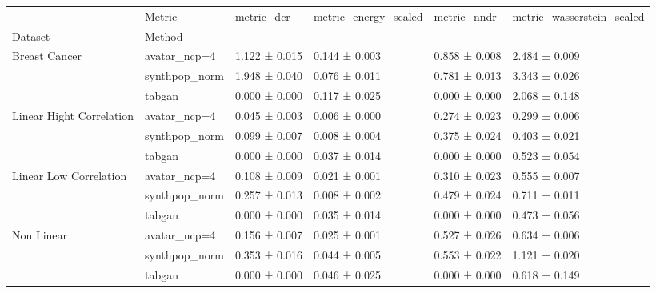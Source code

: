 \begin{tabular}{llllll}
\toprule
 & Metric & metric_dcr & metric_energy_scaled & metric_nndr & metric_wasserstein_scaled \\
Dataset & Method &  &  &  &  \\
\midrule
\multirow[t]{3}{*}{Breast Cancer} & avatar_ncp=4 & 1.122 ± 0.015 & \cellcolor{myred}0.144 ± 0.003 & \cellcolor{myred}0.858 ± 0.008 & 2.484 ± 0.009 \\
 & synthpop_norm & \cellcolor{myred}1.948 ± 0.040 & \cellcolor{mygreen}0.076 ± 0.011 & 0.781 ± 0.013 & \cellcolor{myred}3.343 ± 0.026 \\
 & tabgan & \cellcolor{mygreen}0.000 ± 0.000 & 0.117 ± 0.025 & \cellcolor{mygreen}0.000 ± 0.000 & \cellcolor{mygreen}2.068 ± 0.148 \\
\cline{1-6}
\multirow[t]{3}{*}{Linear 
 Hight Correlation} & avatar_ncp=4 & 0.045 ± 0.003 & \cellcolor{mygreen}0.006 ± 0.000 & 0.274 ± 0.023 & \cellcolor{mygreen}0.299 ± 0.006 \\
 & synthpop_norm & \cellcolor{myred}0.099 ± 0.007 & 0.008 ± 0.004 & \cellcolor{myred}0.375 ± 0.024 & 0.403 ± 0.021 \\
 & tabgan & \cellcolor{mygreen}0.000 ± 0.000 & \cellcolor{myred}0.037 ± 0.014 & \cellcolor{mygreen}0.000 ± 0.000 & \cellcolor{myred}0.523 ± 0.054 \\
\cline{1-6}
\multirow[t]{3}{*}{Linear 
 Low Correlation} & avatar_ncp=4 & 0.108 ± 0.009 & 0.021 ± 0.001 & 0.310 ± 0.023 & 0.555 ± 0.007 \\
 & synthpop_norm & \cellcolor{myred}0.257 ± 0.013 & \cellcolor{mygreen}0.008 ± 0.002 & \cellcolor{myred}0.479 ± 0.024 & \cellcolor{myred}0.711 ± 0.011 \\
 & tabgan & \cellcolor{mygreen}0.000 ± 0.000 & \cellcolor{myred}0.035 ± 0.014 & \cellcolor{mygreen}0.000 ± 0.000 & \cellcolor{mygreen}0.473 ± 0.056 \\
\cline{1-6}
\multirow[t]{3}{*}{Non Linear} & avatar_ncp=4 & 0.156 ± 0.007 & \cellcolor{mygreen}0.025 ± 0.001 & 0.527 ± 0.026 & 0.634 ± 0.006 \\
 & synthpop_norm & \cellcolor{myred}0.353 ± 0.016 & 0.044 ± 0.005 & \cellcolor{myred}0.553 ± 0.022 & \cellcolor{myred}1.121 ± 0.020 \\
 & tabgan & \cellcolor{mygreen}0.000 ± 0.000 & \cellcolor{myred}0.046 ± 0.025 & \cellcolor{mygreen}0.000 ± 0.000 & \cellcolor{mygreen}0.618 ± 0.149 \\
\cline{1-6}
\bottomrule
\end{tabular}
